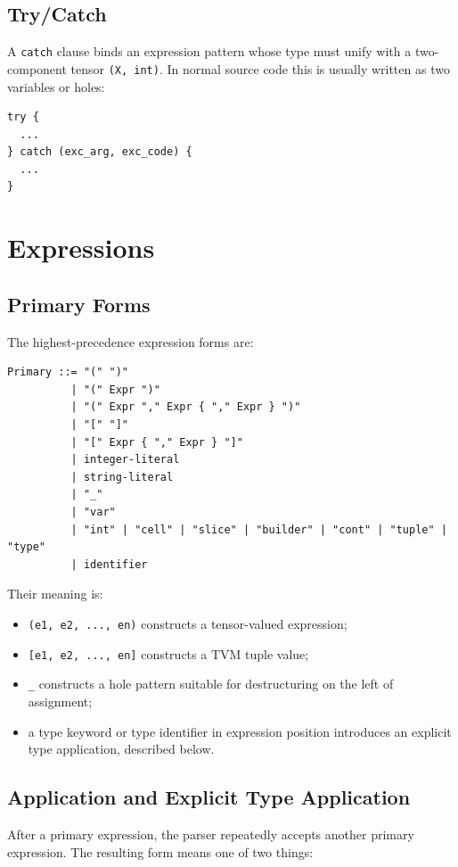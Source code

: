\documentclass[12pt,oneside]{article}
\begin{document}
\subsection{Try/Catch}
A \verb|catch| clause binds an expression pattern whose type must unify with a
two-component tensor \verb|(X, int)|. In normal source code this is usually
written as two variables or holes:

\begin{verbatim}
try {
  ...
} catch (exc_arg, exc_code) {
  ...
}
\end{verbatim}

\section{Expressions}
\label{sec:expressions}
\subsection{Primary Forms}
The highest-precedence expression forms are:

\begin{verbatim}
Primary ::= "(" ")"
          | "(" Expr ")"
          | "(" Expr "," Expr { "," Expr } ")"
          | "[" "]"
          | "[" Expr { "," Expr } "]"
          | integer-literal
          | string-literal
          | "_"
          | "var"
          | "int" | "cell" | "slice" | "builder" | "cont" | "tuple" | "type"
          | identifier
\end{verbatim}

Their meaning is:

\begin{itemize}
\item \verb|(e1, e2, ..., en)| constructs a tensor-valued expression;
\item \verb|[e1, e2, ..., en]| constructs a TVM tuple value;
\item \verb|_| constructs a hole pattern suitable for destructuring on the left
of assignment;
\item a type keyword or type identifier in expression position introduces an
explicit type application, described below.
\end{itemize}

\subsection{Application and Explicit Type Application}
After a primary expression, the parser repeatedly accepts another primary
expression. The resulting form means one of two things:
\end{document}

